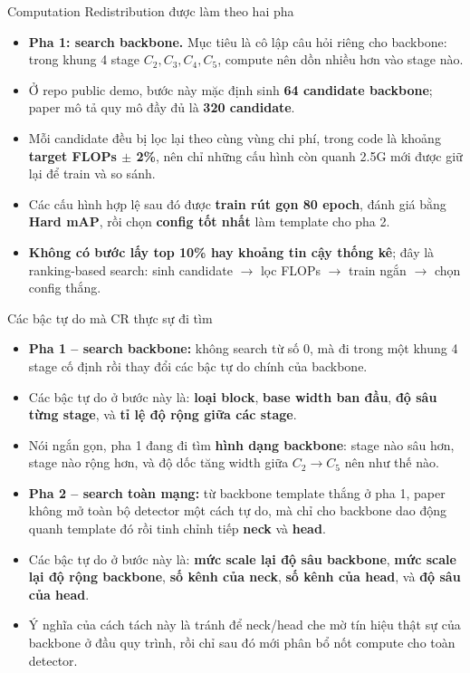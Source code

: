 \documentclass[aspectratio=169,11pt]{beamer}
\begin{document}
\begin{frame}{Computation Redistribution được làm theo hai pha}
  \begin{itemize}
    \item \textbf{Pha 1: search backbone.} Mục tiêu là cô lập câu hỏi riêng cho backbone: trong khung 4 stage \(C_2,C_3,C_4,C_5\), compute nên dồn nhiều hơn vào stage nào.
    \item Ở repo public demo, bước này mặc định sinh \textbf{64 candidate backbone}; paper mô tả quy mô đầy đủ là \textbf{320 candidate}.
    \item Mỗi candidate đều bị lọc lại theo cùng vùng chi phí, trong code là khoảng \textbf{target FLOPs \(\pm\) 2\%}, nên chỉ những cấu hình còn quanh 2.5G mới được giữ lại để train và so sánh.
    \item Các cấu hình hợp lệ sau đó được \textbf{train rút gọn 80 epoch}, đánh giá bằng \textbf{Hard mAP}, rồi chọn \textbf{config tốt nhất} làm template cho pha 2.
    \item \textbf{Không có bước lấy top 10\% hay khoảng tin cậy thống kê}; đây là ranking-based search: sinh candidate \(\rightarrow\) lọc FLOPs \(\rightarrow\) train ngắn \(\rightarrow\) chọn config thắng.
  \end{itemize}
\end{frame}

\begin{frame}[shrink=8]{Các bậc tự do mà CR thực sự đi tìm}
  \begin{itemize}
    \item \textbf{Pha 1 -- search backbone:} không search từ số 0, mà đi trong một khung 4 stage cố định rồi thay đổi các bậc tự do chính của backbone.
    \item Các bậc tự do ở bước này là: \textbf{loại block}, \textbf{base width ban đầu}, \textbf{độ sâu từng stage}, và \textbf{tỉ lệ độ rộng giữa các stage}.
    \item Nói ngắn gọn, pha 1 đang đi tìm \textbf{hình dạng backbone}: stage nào sâu hơn, stage nào rộng hơn, và độ dốc tăng width giữa \(C_2 \rightarrow C_5\) nên như thế nào.
    \item \textbf{Pha 2 -- search toàn mạng:} từ backbone template thắng ở pha 1, paper không mở toàn bộ detector một cách tự do, mà chỉ cho backbone dao động quanh template đó rồi tinh chỉnh tiếp \textbf{neck} và \textbf{head}.
    \item Các bậc tự do ở bước này là: \textbf{mức scale lại độ sâu backbone}, \textbf{mức scale lại độ rộng backbone}, \textbf{số kênh của neck}, \textbf{số kênh của head}, và \textbf{độ sâu của head}.
    \item Ý nghĩa của cách tách này là tránh để neck/head che mờ tín hiệu thật sự của backbone ở đầu quy trình, rồi chỉ sau đó mới phân bổ nốt compute cho toàn detector.
  \end{itemize}
\end{frame}
\end{document}
